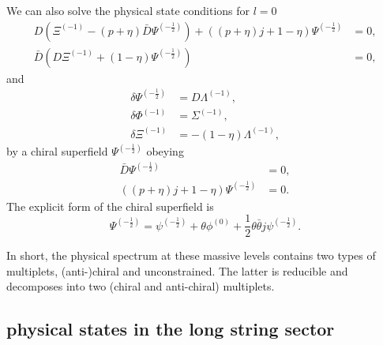 \documentclass[a4paper,seceq,preprint]{ptptex}
\begin{document}
We can also solve the physical state conditions for $l=0$
 \begin{align}
  D\left(\Xi^{(-1)}-(p+\eta)\bar D\Psi^{(-\frac{1}{2})}\right)
   +\left((p+\eta)j+1-\eta\right)\Psi^{(-\frac{1}{2})}&=0,\nonumber\\
  \bar D\left(D\Xi^{(-1)}+(1-\eta)\Psi^{(-\frac{1}{2})}\right)&=0,
\end{align}
and
\begin{align}
  \delta\Psi^{(-\frac{1}{2})}&=D\Lambda^{(-1)},\nonumber\\
  \delta\Phi^{(-1)}&=\Sigma^{(-1)},\nonumber\\
  \delta\Xi^{(-1)}&=-(1-\eta)\Lambda^{(-1)},
\end{align}
by a chiral superfield $\Psi^{(-\frac{1}{2})}$ obeying
\begin{align}
  \bar D\Psi^{(-\frac{1}{2})}&=0,\nonumber\\
  \left((p+\eta)j+1-\eta\right)\Psi^{(-\frac{1}{2})}&=0. 
\end{align}
The explicit form of the chiral superfield is 
\begin{equation}
 \Psi^{(-\frac{1}{2})}=\psi^{(-\frac{1}{2})}+\theta\phi^{(0)}+
\frac{1}{2}\theta\bar\theta j\psi^{(-\frac{1}{2})}.
\end{equation}

In short, the physical spectrum at these massive levels
contains two types of multiplets, (anti-)chiral and
unconstrained. The latter is reducible and
decomposes into two (chiral and anti-chiral) multiplets.


\subsection{physical states in the long string sector}
\end{document}
